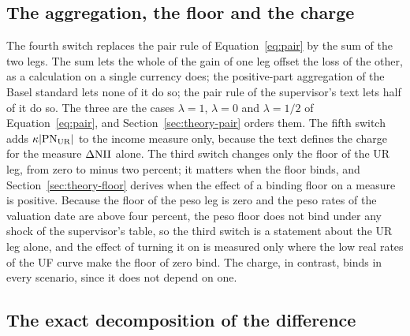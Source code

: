 \subsection{The aggregation, the floor and the charge}
\label{sec:method-others}

The fourth switch replaces the pair rule of Equation~\eqref{eq:pair} by the sum of the two legs. The sum lets the whole of the gain of one leg offset the loss of the other, as a calculation on a single currency does; the positive-part aggregation of the Basel standard lets none of it do so; the pair rule of the supervisor's text lets half of it do so. The three are the cases $\lambda=1$, $\lambda=0$ and $\lambda=1/2$ of Equation~\eqref{eq:pair}, and Section~\ref{sec:theory-pair} orders them. The fifth switch adds $\kappa|\mathrm{PN}_{\mathrm{UR}}|$ to the income measure only, because the text defines the charge for the measure $\Delta\mathrm{NII}$ alone. The third switch changes only the floor of the UR leg, from zero to minus two percent; it matters when the floor binds, and Section~\ref{sec:theory-floor} derives when the effect of a binding floor on a measure is positive. Because the floor of the peso leg is zero and the peso rates of the valuation date are above four percent, the peso floor does not bind under any shock of the supervisor's table, so the third switch is a statement about the UR leg alone, and the effect of turning it on is measured only where the low real rates of the UF curve make the floor of zero bind. The charge, in contrast, binds in every scenario, since it does not depend on one.

\subsection{The exact decomposition of the difference}
\label{sec:method-shapley}

